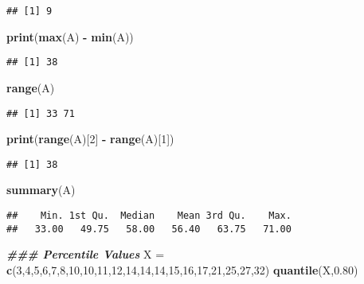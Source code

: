 \documentclass[
]{article}
\newenvironment{Shaded}{\begin{snugshade}}{\end{snugshade}}
\newcommand{\DecValTok}[1]{\textcolor[rgb]{0.00,0.00,0.81}{#1}}
\newcommand{\DocumentationTok}[1]{\textcolor[rgb]{0.56,0.35,0.01}{\textbf{\textit{#1}}}}
\newcommand{\FloatTok}[1]{\textcolor[rgb]{0.00,0.00,0.81}{#1}}
\newcommand{\FunctionTok}[1]{\textcolor[rgb]{0.13,0.29,0.53}{\textbf{#1}}}
\newcommand{\NormalTok}[1]{#1}
\newcommand{\OtherTok}[1]{\textcolor[rgb]{0.56,0.35,0.01}{#1}}
\newcommand{\SpecialCharTok}[1]{\textcolor[rgb]{0.81,0.36,0.00}{\textbf{#1}}}
\begin{document}
\begin{verbatim}
## [1] 9
\end{verbatim}

\begin{Shaded}
\begin{Highlighting}[]
\FunctionTok{print}\NormalTok{(}\FunctionTok{max}\NormalTok{(A) }\SpecialCharTok{{-}} \FunctionTok{min}\NormalTok{(A))}
\end{Highlighting}
\end{Shaded}

\begin{verbatim}
## [1] 38
\end{verbatim}

\begin{Shaded}
\begin{Highlighting}[]
\FunctionTok{range}\NormalTok{(A)}
\end{Highlighting}
\end{Shaded}

\begin{verbatim}
## [1] 33 71
\end{verbatim}

\begin{Shaded}
\begin{Highlighting}[]
\FunctionTok{print}\NormalTok{(}\FunctionTok{range}\NormalTok{(A)[}\DecValTok{2}\NormalTok{] }\SpecialCharTok{{-}} \FunctionTok{range}\NormalTok{(A)[}\DecValTok{1}\NormalTok{]) }
\end{Highlighting}
\end{Shaded}

\begin{verbatim}
## [1] 38
\end{verbatim}

\begin{Shaded}
\begin{Highlighting}[]
\FunctionTok{summary}\NormalTok{(A)}
\end{Highlighting}
\end{Shaded}

\begin{verbatim}
##    Min. 1st Qu.  Median    Mean 3rd Qu.    Max. 
##   33.00   49.75   58.00   56.40   63.75   71.00
\end{verbatim}

\begin{Shaded}
\begin{Highlighting}[]
\DocumentationTok{\#\#\# Percentile Values}
\NormalTok{X }\OtherTok{=} \FunctionTok{c}\NormalTok{(}\DecValTok{3}\NormalTok{,}\DecValTok{4}\NormalTok{,}\DecValTok{5}\NormalTok{,}\DecValTok{6}\NormalTok{,}\DecValTok{7}\NormalTok{,}\DecValTok{8}\NormalTok{,}\DecValTok{10}\NormalTok{,}\DecValTok{10}\NormalTok{,}\DecValTok{11}\NormalTok{,}\DecValTok{12}\NormalTok{,}\DecValTok{14}\NormalTok{,}\DecValTok{14}\NormalTok{,}\DecValTok{14}\NormalTok{,}\DecValTok{15}\NormalTok{,}\DecValTok{16}\NormalTok{,}\DecValTok{17}\NormalTok{,}\DecValTok{21}\NormalTok{,}\DecValTok{25}\NormalTok{,}\DecValTok{27}\NormalTok{,}\DecValTok{32}\NormalTok{)}
\FunctionTok{quantile}\NormalTok{(X,}\FloatTok{0.80}\NormalTok{)}
\end{Highlighting}
\end{Shaded}
\end{document}
